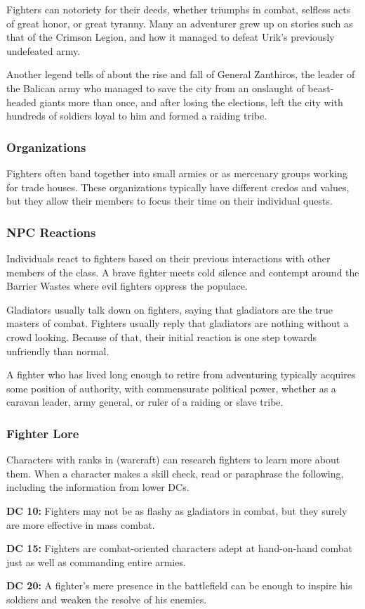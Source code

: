 Fighters can notoriety for their deeds, whether triumphs in combat, selfless acts of great honor, or great tyranny. Many an adventurer grew up on stories such as that of the Crimson Legion, and how it managed to defeat Urik's previously undefeated army.

Another legend tells of about the rise and fall of General Zanthiros, the leader of the Balican army who managed to save the city from an onslaught of beast-headed giants more than once, and after losing the elections, left the city with hundreds of soldiers loyal to him and formed a raiding tribe.

\subsubsection{Organizations}

Fighters often band together into small armies or as mercenary groups working for trade houses. These organizations typically have different credos and values, but they allow their members to focus their time on their individual quests.

\subsubsection{NPC Reactions}

Individuals react to fighters based on their previous interactions with other members of the class. A brave fighter meets cold silence and contempt around the Barrier Wastes where evil fighters oppress the populace.

Gladiators usually talk down on fighters, saying that gladiators are the true masters of combat. Fighters usually reply that gladiators are nothing without a crowd looking. Because of that, their initial reaction is one step towards unfriendly than normal.

A fighter who has lived long enough to retire from adventuring typically acquires some position of authority, with commensurate political power, whether as a caravan leader, army general, or ruler of a raiding or slave tribe.

\subsubsection{Fighter Lore}

Characters with ranks in  (warcraft) can research fighters to learn more about them. When a character makes a skill check, read or paraphrase the following, including the information from lower DCs.

\textbf{DC 10:} Fighters may not be as flashy as gladiators in combat, but they surely are more effective in mass combat.

\textbf{DC 15:} Fighters are combat-oriented characters adept at hand-on-hand combat just as well as commanding entire armies.

\textbf{DC 20:} A fighter's mere presence in the battlefield can be enough to inspire his soldiers and weaken the resolve of his enemies.
